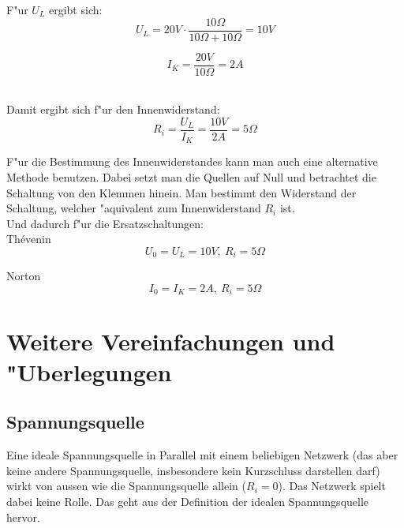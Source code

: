 \documentclass[german, 10pt, a4paper, headsepline]{scrreprt}
\theoremstyle{remark}
\begin{document}
F"ur $U_L$ ergibt sich:
\begin{displaymath}
	U_L = 20 V \cdotp \frac{10 \Omega}{10 \Omega + 10 \Omega} = 10 V
\end{displaymath}

\normalfont

\begin{figure}[hbt]
 
 \centerline{\box\graph}
\end{figure}

\begin{displaymath}
	I_K = \frac{20 V}{ 10 \Omega} = 2 A
\end{displaymath}

\ \\
Damit ergibt sich f"ur den Innenwiderstand:
\begin{displaymath}
	R_i = \frac{U_L}{I_K} = \frac{10 V}{ 2 A} = 5 \Omega
\end{displaymath}

F"ur die Bestimmung des Innenwiderstandes kann man auch eine alternative Methode benutzen. Dabei setzt man die Quellen auf Null und betrachtet die Schaltung von den Klemmen hinein. Man bestimmt den Widerstand der Schaltung, welcher "aquivalent zum Innenwiderstand $R_i$ ist.\\

Und dadurch f"ur die Ersatzschaltungen:\\

Th\'evenin
\begin{displaymath}
	U_0 = U_L = 10 V, \ R_i= 5 \Omega
\end{displaymath}

Norton
\begin{displaymath}
	I_0 = I_K = 2 A, \ R_i= 5 \Omega
\end{displaymath}

\section{Weitere Vereinfachungen und "Uberlegungen}

\subsection{Spannungsquelle}

Eine ideale Spannungsquelle in Parallel mit einem beliebigen Netzwerk (das aber keine andere Spannungsquelle, insbesondere kein Kurzschluss darstellen darf) wirkt von aussen wie die Spannungsquelle allein ($R_i = 0$). Das Netzwerk spielt dabei keine Rolle. Das geht aus der Definition der idealen Spannungsquelle hervor.
\end{document}
